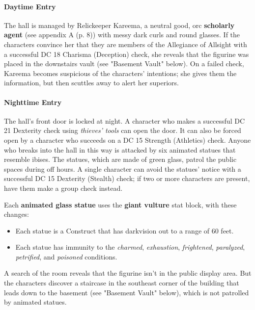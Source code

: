\documentclass[a4paper, 11pt, bg=full, twocolumn, nooutline]{dndbook}
\begin{document}
\paragraph{Daytime Entry}

The hall is managed by Relickeeper Kareema, a neutral good, orc \textbf{scholarly agent} (see appendix A (p. 8)) with messy dark curls and round glasses. If the characters convince her that they are members of the Allegiance of Allsight with a successful DC 18 Charisma (Deception) check, she reveals that the figurine was placed in the downstairs vault (see "Basement Vault" below). On a failed check, Kareema becomes suspicious of the characters' intentions; she gives them the information, but then scuttles away to alert her superiors.

\paragraph{Nighttime Entry}

The hall's front door is locked at night. A character who makes a successful DC 21 Dexterity check using \textit{thieves' tools} can open the door. It can also be forced open by a character who succeeds on a DC 15 Strength (Athletics) check. Anyone who breaks into the hall in this way is attacked by six animated statues that resemble ibises. The statues, which are made of green glass, patrol the public spaces during off hours. A single character can avoid the statues' notice with a successful DC 15 Dexterity (Stealth) check; if two or more characters are present, have them make a group check instead.

Each \textbf{animated glass statue} uses the \textbf{giant vulture} stat block, with these changes:

\begin{itemize}
\item Each statue is a Construct that has darkvision out to a range of 60 feet.
\item Each statue has immunity to the \textit{charmed}, \textit{exhaustion}, \textit{frightened}, \textit{paralyzed}, \textit{petrified}, and \textit{poisoned} conditions.
\end{itemize}

A search of the room reveals that the figurine isn't in the public display area. But the characters discover a staircase in the southeast corner of the building that leads down to the basement (see "Basement Vault" below), which is not patrolled by animated statues.
\end{document}
